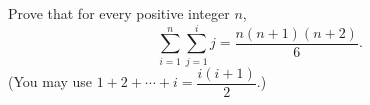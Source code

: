 Prove that for every positive integer $n$,
\[\sum_{i=1}^{n}\sum_{j=1}^{i}j=\dfrac{n(n+1)(n+2)}{6}.\]
(You may use $1+2+\cdots+i=\dfrac{i(i+1)}{2}$.)
